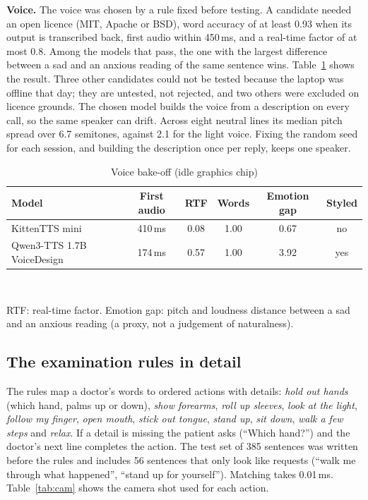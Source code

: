 \documentclass[journal]{IEEEtran}
\begin{document}
\textbf{Voice.} The voice was chosen by a rule fixed before testing. A candidate needed an open licence (MIT, Apache or BSD), word accuracy of at least 0.93 when its output is transcribed back, first audio within 450\,ms, and a real-time factor of at most 0.8. Among the models that pass, the one with the largest difference between a sad and an anxious reading of the same sentence wins. Table~\ref{tab:tts} shows the result. Three
other candidates could not be tested because the laptop was offline that day; they are untested, not rejected, and two others were excluded on
licence grounds. The chosen model builds the voice from a description on every call, so the same speaker can drift. Across eight neutral lines its median pitch spread over 6.7 semitones, against 2.1 for the light voice. Fixing the random seed for each session, and building the description
once per reply, keeps one speaker.

\begin{table}[t]
\caption{Voice bake-off (idle graphics chip)}
\label{tab:tts}
\centering
\scriptsize
\setlength{\tabcolsep}{3pt}
\begin{tabular}{@{}lccccc@{}}
\toprule
Model & First audio & RTF & Words & Emotion gap & Styled\\
\midrule
KittenTTS mini & 410\,ms & 0.08 & 1.00 & 0.67 & no\\
Qwen3-TTS 1.7B VoiceDesign & 174\,ms & 0.57 & 1.00 & 3.92 & yes\\
\bottomrule
\end{tabular}
\\[1mm]\raggedright\scriptsize RTF: real-time factor. Emotion gap: pitch and loudness distance between a sad and an anxious reading (a proxy, not a
judgement of naturalness).
\end{table}

\subsection{The examination rules in detail}
The rules map a doctor's words to ordered actions with details: \emph{hold out hands} (which hand, palms up or down), \emph{show forearms},
\emph{roll up sleeves}, \emph{look at the light}, \emph{follow my finger}, \emph{open mouth}, \emph{stick out tongue}, \emph{stand up},
\emph{sit down}, \emph{walk a few steps} and \emph{relax}. If a detail is missing the patient asks (``Which hand?'') and the doctor's next line
completes the action. The test set of 385 sentences was written before the rules and includes 56 sentences that only look like requests (``walk
me through what happened'', ``stand up for yourself''). Matching takes 0.01\,ms. Table~\ref{tab:cam} shows the camera shot used for each action.
\end{document}
